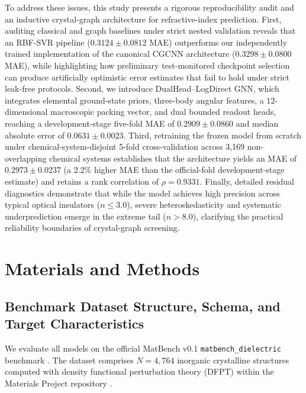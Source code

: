 \documentclass[final,3p,times]{elsarticle}
\begin{document}
To address these issues, this study presents a rigorous reproducibility audit and an inductive crystal-graph architecture for refractive-index prediction. First, auditing classical and graph baselines under strict nested validation reveals that an RBF-SVR pipeline ($0.3124 \pm 0.0812$ MAE) outperforms our independently trained implementation of the canonical CGCNN architecture ($0.3298 \pm 0.0800$ MAE), while highlighting how preliminary test-monitored checkpoint selection can produce artificially optimistic error estimates that fail to hold under strict leak-free protocols. Second, we introduce DualHead--LogDirect GNN, which integrates elemental ground-state priors, three-body angular features, a 12-dimensional macroscopic packing vector, and dual bounded readout heads, reaching a development-stage five-fold MAE of $0.2909 \pm 0.0860$ and median absolute error of $0.0631 \pm 0.0023$. Third, retraining the frozen model from scratch under chemical-system-disjoint 5-fold cross-validation across 3,169 non-overlapping chemical systems establishes that the architecture yields an MAE of $0.2973 \pm 0.0237$ (a 2.2\% higher MAE than the official-fold development-stage estimate) and retains a rank correlation of $\rho = 0.9331$. Finally, detailed residual diagnostics demonstrate that while the model achieves high precision across typical optical insulators ($n \le 3.0$), severe heteroskedasticity and systematic underprediction emerge in the extreme tail ($n > 8.0$), clarifying the practical reliability boundaries of crystal-graph screening.

\section{Materials and Methods}

\subsection{Benchmark Dataset Structure, Schema, and Target Characteristics}
We evaluate all models on the official MatBench v0.1 \texttt{matbench\_dielectric} benchmark \cite{dunn2020benchmarking}. The dataset comprises $N = 4{,}764$ inorganic crystalline structures computed with density functional perturbation theory (DFPT) within the Materials Project repository \cite{jain2013commentary, petousis2017high}.
\end{document}
